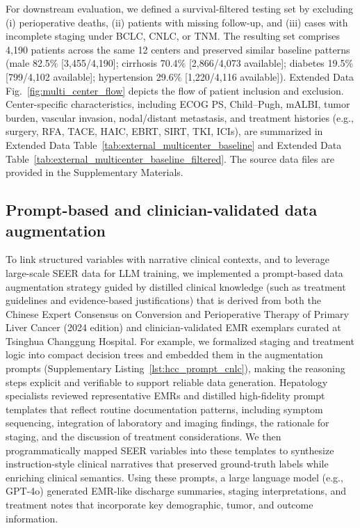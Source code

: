 \documentclass{article}
\begin{document}
For downstream evaluation, we defined a survival-filtered testing set by excluding (i) perioperative deaths, (ii) patients with missing follow-up, and (iii) cases with incomplete staging under BCLC, CNLC, or TNM. The resulting set comprises 4{,}190 patients across the same 12 centers and preserved similar baseline patterns (male 82.5\% [3{,}455/4{,}190]; cirrhosis 70.4\% [2{,}866/4{,}073 available]; diabetes 19.5\% [799/4{,}102 available]; hypertension 29.6\% [1{,}220/4{,}116 available]). Extended Data Fig.~\ref{fig:multi_center_flow} depicts the flow of patient inclusion and exclusion. Center-specific characteristics, including ECOG PS, Child–Pugh, mALBI, tumor burden, vascular invasion, nodal/distant metastasis, and treatment histories (e.g., surgery, RFA, TACE, HAIC, EBRT, SIRT, TKI, ICIs), are summarized in Extended Data Table~\ref{tab:external_multicenter_baseline} and Extended Data Table~\ref{tab:external_multicenter_baseline_filtered}. The source data files are provided in the Supplementary Materials.


\subsection{Prompt-based and clinician-validated data augmentation} 
To link structured variables with narrative clinical contexts, and to leverage large-scale SEER data for LLM training, we implemented a prompt-based data augmentation strategy guided by distilled clinical knowledge (such as treatment guidelines and evidence-based justifications) that is derived from both the Chinese Expert Consensus on Conversion and Perioperative Therapy of Primary Liver Cancer (2024 edition) and clinician-validated EMR exemplars curated at Tsinghua Changgung Hospital. For example, we formalized staging and treatment logic into compact decision trees and embedded them in the augmentation prompts (Supplementary Listing~\ref {lst:hcc_prompt_cnlc}), making the reasoning steps explicit and verifiable to support reliable data generation.
Hepatology specialists reviewed representative EMRs and distilled high-fidelity prompt templates that reflect routine documentation patterns, including symptom sequencing, integration of laboratory and imaging findings, the rationale for staging, and the discussion of treatment considerations. We then programmatically mapped SEER variables into these templates to synthesize instruction-style clinical narratives that preserved ground-truth labels while enriching clinical semantics. Using these prompts, a large language model (e.g., GPT-4o) generated EMR-like discharge summaries, staging interpretations, and treatment notes that incorporate key demographic, tumor, and outcome information.
\end{document}
